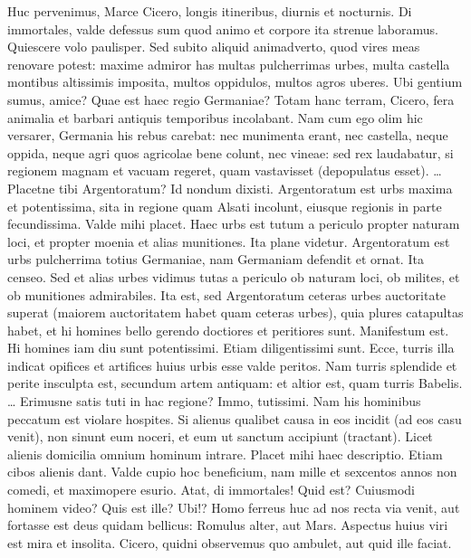 \documentclass[20pt, twoside]{extarticle}
\newcommand{\adjustright}{\vspace{.28em}} %
\newcommand{\alt}[1]{(#1)}
\begin{document}
\begin{pages}
\begin{Rightside}
	\pend
		\adjustright\noindent
		Huc pervenimus, Marce Cicero, longis itineribus, diurnis et nocturnis. Di immortales, valde defessus sum quod animo et corpore ita strenue laboramus. Quiescere volo paulisper. Sed subito aliquid animadverto, quod vires meas renovare potest: maxime admiror has multas pulcherrimas urbes, multa castella montibus altissimis imposita, multos oppidulos, multos agros uberes. Ubi gentium sumus, amice? Quae est haec regio Germaniae? Totam hanc terram, Cicero, fera animalia et barbari antiquis temporibus incolabant. Nam cum ego olim hic versarer, Germania his rebus carebat: nec munimenta erant, nec castella, neque oppida, neque agri quos agricolae bene colunt, nec vineae: sed rex laudabatur, si regionem magnam et vacuam regeret, quam vastavisset \alt{depopulatus esset}. \dots
	\pend
	\pstart
		Placetne tibi Argentoratum? Id nondum dixisti. Argentoratum est urbs maxima et potentissima, sita in regione quam Alsati incolunt, eiusque regionis in parte fecundissima. Valde mihi placet. Haec urbs est tutum a periculo propter naturam loci, et propter moenia et alias munitiones. Ita plane videtur. Argentoratum est urbs pulcherrima totius Germaniae, nam Germaniam defendit et ornat. Ita censeo. Sed et alias urbes vidimus tutas a periculo ob naturam loci, ob milites, et ob munitiones admirabiles. Ita est, sed Argentoratum ceteras urbes auctoritate superat \alt{maiorem auctoritatem habet quam ceteras urbes}, quia plures catapultas habet, et hi homines bello gerendo doctiores et peritiores sunt. Manifestum est. Hi homines iam diu sunt potentissimi. Etiam diligentissimi sunt. Ecce, turris illa indicat opifices et artifices huius urbis esse valde peritos. Nam turris splendide et perite insculpta est, secundum artem antiquam: et altior est, quam turris Babelis. \dots
	\pend
	\pstart
		Erimusne satis tuti in hac regione? Immo, tutissimi. Nam his hominibus peccatum est violare hospites. Si alienus qualibet causa in eos incidit \alt{ad eos casu venit}, non sinunt eum noceri, et eum ut sanctum accipiunt \alt{tractant}. Licet alienis domicilia omnium hominum intrare. Placet mihi haec descriptio. Etiam cibos alienis dant. Valde cupio hoc beneficium, nam mille et sexcentos annos non comedi, et maximopere esurio. Atat, di immortales! Quid est? Cuiusmodi hominem video? Quis est ille? Ubi!? Homo ferreus huc ad nos recta via venit, aut fortasse est deus quidam bellicus: Romulus alter, aut Mars. Aspectus huius viri est mira et insolita. Cicero, quidni observemus quo ambulet, aut quid ille faciat.
	\pend
	\endnumbering
\end{Rightside}
\end{pages}
\Pages
\end{document}
